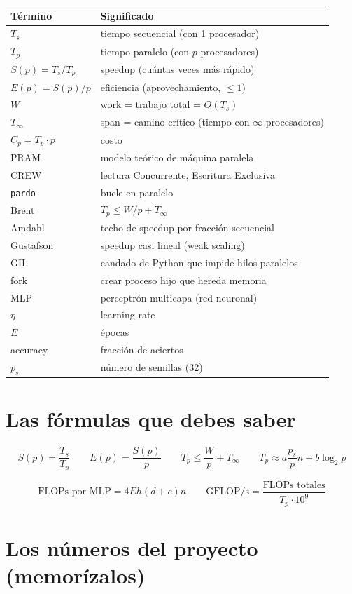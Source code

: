\documentclass[11pt,a4paper]{article}
\begin{document}
\begin{tabular}{ll}
\toprule
Término & Significado \\\midrule
$T_s$ & tiempo secuencial (con 1 procesador) \\
$T_p$ & tiempo paralelo (con $p$ procesadores) \\
$S(p)=T_s/T_p$ & speedup (cuántas veces más rápido) \\
$E(p)=S(p)/p$ & eficiencia (aprovechamiento, $\le 1$) \\
$W$ & work = trabajo total = $O(T_s)$ \\
$T_\infty$ & span = camino crítico (tiempo con $\infty$ procesadores) \\
$C_p=T_p\cdot p$ & costo \\
PRAM & modelo teórico de máquina paralela \\
CREW & lectura Concurrente, Escritura Exclusiva \\
\texttt{pardo} & bucle en paralelo \\
Brent & $T_p\le W/p + T_\infty$ \\
Amdahl & techo de speedup por fracción secuencial \\
Gustafson & speedup casi lineal (weak scaling) \\
GIL & candado de Python que impide hilos paralelos \\
fork & crear proceso hijo que hereda memoria \\
MLP & perceptrón multicapa (red neuronal) \\
$\eta$ & learning rate \\
$E$ & épocas \\
accuracy & fracción de aciertos \\
$p_s$ & número de semillas (32) \\
\bottomrule
\end{tabular}

\section{Las fórmulas que debes saber}

\[
S(p)=\frac{T_s}{T_p}\qquad E(p)=\frac{S(p)}{p}\qquad
T_p\le\frac{W}{p}+T_\infty\qquad T_p\approx a\frac{p_s}{p}n+b\log_2 p
\]

\[
\text{FLOPs por MLP}=4Eh(d+c)n\qquad
\text{GFLOP/s}=\frac{\text{FLOPs totales}}{T_p\cdot 10^9}
\]

\section{Los números del proyecto (memorízalos)}
\end{document}

